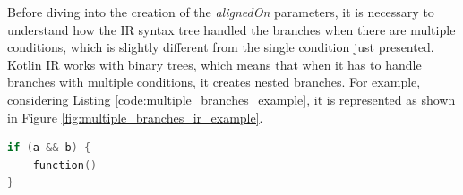 Before diving into the creation of the \textit{alignedOn} parameters, it is necessary to understand how the IR syntax tree handled the branches when there are multiple conditions, which is slightly different from the single condition just presented. Kotlin IR works with binary trees, which means that when it has to handle branches with multiple conditions, it creates nested branches.\newline
For example, considering Listing \ref{code:multiple_branches_example}, it is represented as shown in Figure \ref{fig:multiple_branches_ir_example}.
\begin{lstlisting}[caption={Example of code where a branch has multiple conditions}, captionpos=b, language=Kotlin, label={code:multiple_branches_example}]
if (a && b) {
    function()
}
\end{lstlisting}

